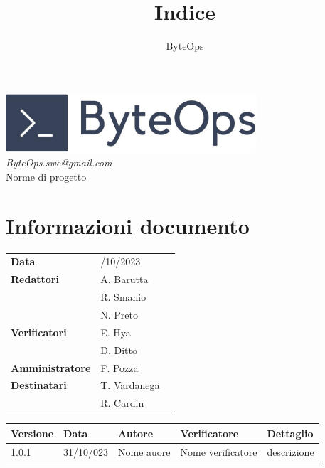 \documentclass{article}
\title{\textbf{\fontsize{28}{6}\selectfont Indice}}
\author{\fontsize{14}{6}\selectfont ByteOps}
\begin{document}
\pagestyle{fancy}
\begin{center}
\includegraphics[width = 0.7\textwidth]{../../Images/logo.png} \\
\vspace{0.2cm}
\textcolor[RGB]{60, 60, 60}{\textit{ByteOps.swe@gmail.com}} \\
\vspace{2cm}
\fontsize{16}{6}\selectfont Norme di progetto \\ 
\vspace{0.5cm}
\end{center}

\section*{Informazioni documento}
\def\arraystretch{1.2}
\begin{tabular}{>{\raggedleft\arraybackslash}p{}|>{\raggedright\arraybackslash}p{}c}
\hline
\addlinespace
    \textbf{Data} & 30/10/2023 \vspace{10pt} \\
    \textbf{Redattori} & A. Barutta \\ & R. Smanio \\ & N. Preto \vspace{10pt} \\
    \textbf{Verificatori} & E. Hya  \\ & D. Ditto \vspace{10pt} \\
    \textbf{Amministratore} & F. Pozza \vspace{10pt} \\
    \textbf{Destinatari} & T. Vardanega \\ & R. Cardin \vspace{10pt} \\
\end{tabular}
\pagebreak 


\begin{tabular}{|C{2.5cm}|C{2.5cm}|C{2.5cm}|C{2.5cm}|C{2.5cm}|}
    \hline
    \textbf{Versione} & \textbf{Data} & \textbf{Autore} & \textbf{Verificatore} & \textbf{Dettaglio} \\
    \hline \hline
    \label{Git_Action_Version} 1.0.1 & 31/10/023 & Nome auore & Nome verificatore & descrizione \\
    \hline

\end{tabular}
\end{document}
